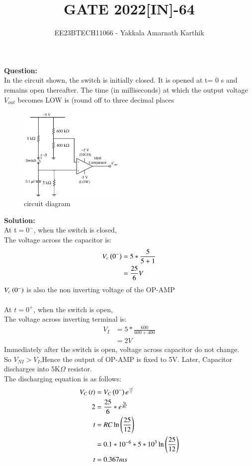 \documentclass[journal,12pt,twocolumn]{IEEEtran}
\begin{document}


\title{GATE 2022[IN]-64}
\author{EE23BTECH11066 - Yakkala Amarnath Karthik}
\maketitle


\textbf{Question:}\\
In the circuit shown, the switch is initially closed. It is opened at t= 0 s and
remains open thereafter. The time (in milliseconds) at which the output voltage
$V_{out}$ becomes LOW is  (round off to three decimal places

\begin{figure}[ht]
    \centering
    \includegraphics[width=0.45\textwidth]{figs/circuit question.png}
    \caption{circuit diagram}
\end{figure}


\textbf{Solution:}\\
At t$=0^-$, when the switch is closed,\\
The voltage across the capacitor is:
\begin{align}
V_c\left(0^-\right)&=5*\frac{5}{5+1}\\
&=\frac{25}{6}V
\end{align}
$V_c\left(0^-\right)$ is also the non inverting voltage of the OP-AMP\\ \\
At $t=0^+$, when the switch is open,\\
The voltage across inverting terminal is:
\begin{align}
V_I&=5*\frac{600}{600+400}\\
&=2V
\end{align}
Immediately after the switch is open, voltage across capacitor do not change.\\ So $V_{NI}>V_I$,Hence the output of OP-AMP is fixed to 5V.
Later, Capacitor discharges into 5K$\Omega$ resistor.\\
The discharging equation is as follows:
\begin{align}
    V_C\left(t\right)&=V_C\left(0^-\right)e^{\frac{-t}{\tau}}\\ 
    2&=\frac{25}{6}*e^{\frac{t_0}{RC}}\\
    t&=RC\ln\left(\frac{25}{12}\right)\\
    &=0.1*10^{-6}*5*10^{3}\ln{\ensuremath{\left(\frac{25}{12}\right)}}\\
    t&=0.367 ms
\end{align}


\end{document}

